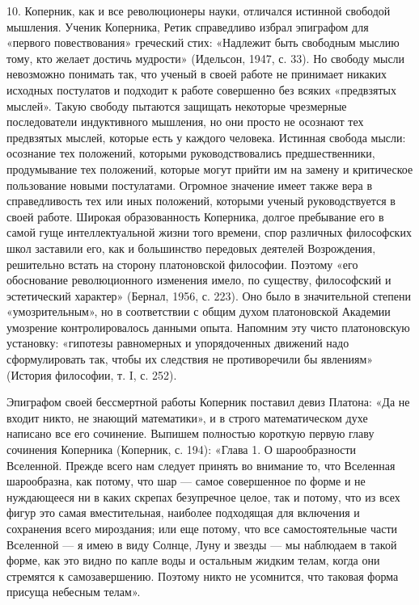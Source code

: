 10.  Коперник,  как  и  все революционеры  науки,  отличался  истинной
свободой   мышления.  Ученик   Коперника,  Ретик   справедливо  избрал
эпиграфом для  «первого повествования» греческий стих:  «Надлежит быть
свободным мыслию  тому, кто желает достичь  мудрости» (Идельсон, 1947,
с. 33). Но  свободу мысли невозможно понимать так, что  ученый в своей
работе не  принимает никаких исходных  постулатов и подходит  к работе
совершенно  без всяких  «предвзятых  мыслей».  Такую свободу  пытаются
защищать некоторые чрезмерные  последователи индуктивного мышления, но
они просто не  осознают тех предвзятых мыслей, которые  есть у каждого
человека. Истинная  свобода мысли:  осознание тех  положений, которыми
руководствовались предшественники, продумывание тех положений, которые
могут   прийти  им   на  замену   и  критическое   пользование  новыми
постулатами. Огромное  значение имеет также вера  в справедливость тех
или иных  положений, которыми  ученый руководствуется в  своей работе.
Широкая образованность  Коперника, долгое пребывание его  в самой гуще
интеллектуальной жизни  того времени, спор различных  философских школ
заставили  его,  как  и большинство  передовых  деятелей  Возрождения,
решительно  встать на  сторону  платоновской  философии. Поэтому  «его
обоснование революционного изменения имело, по существу, философский и
эстетический характер» (Бернал, 1956, с. 223). Оно было в значительной
степени «умозрительным», но в  соответствии с общим духом платоновской
Академии умозрение контролировалось данными  опыта. Напомним эту чисто
платоновскую установку: «гипотезы равномерных и упорядоченных движений
надо  сформулировать  так,  чтобы  их следствия  не  противоречили  бы
явлениям» (История философии, т. I, с. 252).

Эпиграфом своей  бессмертной работы  Коперник поставил  девиз Платона:
«Да не входит никто, не знающий математики», и в строго математическом
духе   написано  все   его  сочинение.   Выпишем  полностью   короткую
первую  главу  сочинения  Коперника  (Коперник,  с.  194):  «Глава  1.
О  шарообразности  Вселенной.  Прежде  всего нам  следует  принять  во
внимание то, что Вселенная шарообразна,  как потому, что шар --- самое
совершенное по форме  и не нуждающееся ни в  каких скрепах безупречное
целое,  так и  потому,  что  из всех  фигур  это самая  вместительная,
наиболее подходящая  для включения и сохранения  всего мироздания; или
еще потому, что все самостоятельные части  Вселенной --- я имею в виду
Солнце, Луну  и звезды --- мы  наблюдаем в такой форме,  как это видно
по  капле  воды  и  остальным  жидким телам,  когда  они  стремятся  к
самозавершению. Поэтому никто не  усомнится, что таковая форма присуща
небесным телам».

